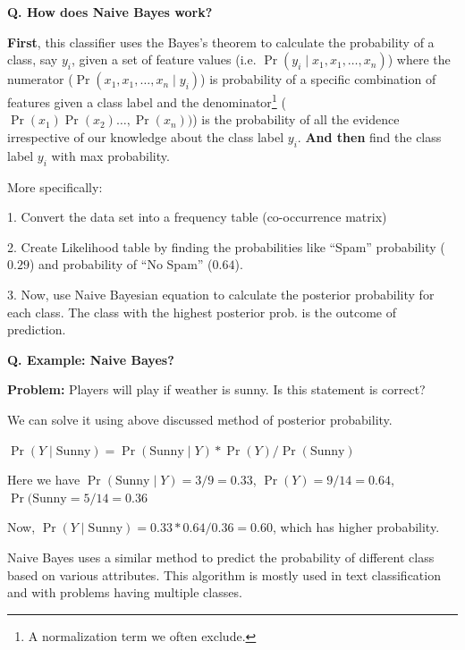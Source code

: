 \begin{frame}[fragile]{\textbf{Q. How does Naive Bayes work?}}
  \begin{wideitemize}
    \item \textbf{First}, this classifier uses the Bayes's theorem to calculate the
      probability of a class, say $y_i$, given a set of feature values (i.e.
      $\Pr(y_i \mid x_1, x_1 , \ldots , x_n)$) {\footnotesize where the
        numerator ($\Pr(x_1, x_1 , \ldots, x_n \mid y_i)$) is probability of a
        specific combination of features given a class label and the
        denominator\footnote{A normalization term we often exclude.}
        ($\Pr(x_1) \Pr(x_2) \ldots, \Pr(x_n))$) is the probability of all the
        evidence irrespective of our knowledge about the class label $y_i$.}
      \textbf{And then} find the class label $y_i$ with max probability.
    \item More specifically:
      \begin{wideitemize}
      \item[1.] Convert the data set into a frequency table (co-occurrence matrix)
      \item[2.] Create Likelihood table by finding the probabilities like
        ``Spam'' probability ($0.29$) and probability of ``No Spam'' ($0.64$).
      \item[3.] Now, use Naive Bayesian equation to calculate the posterior
        probability for each class. The class with the highest posterior prob.
        is the outcome of prediction.
      \end{wideitemize}
  \end{wideitemize}
\end{frame}

\begin{frame}[fragile]{\textbf{Q. Example: Naive Bayes?}}
  \begin{wideitemize}
  \item \textbf{Problem:} Players will play if weather is sunny. Is this statement is correct?\medskip
    \begin{wideitemize}
    \item We can solve it using above discussed method of posterior probability.
    \item $\Pr( Y \mid \text{Sunny} ) = \Pr( \text{Sunny} \mid Y ) * \Pr( Y ) /
      \Pr( \text{Sunny} )$
    \item Here we have $\Pr( \text{Sunny} \mid Y ) = 3/9 = 0.33$, $\Pr( Y ) =
      9/14 = 0.64$, $\Pr( \text{Sunny} = 5/14 = 0.36$
    \item Now, $\Pr( Y \mid \text{Sunny} ) = 0.33 * 0.64 / 0.36 = 0.60$, which
      has higher probability.
    \end{wideitemize}
  \item Naive Bayes uses a similar method to predict the probability of
    different class based on various attributes. This algorithm is mostly used
    in text classification and with problems having multiple classes.
  \end{wideitemize}
\end{frame}

